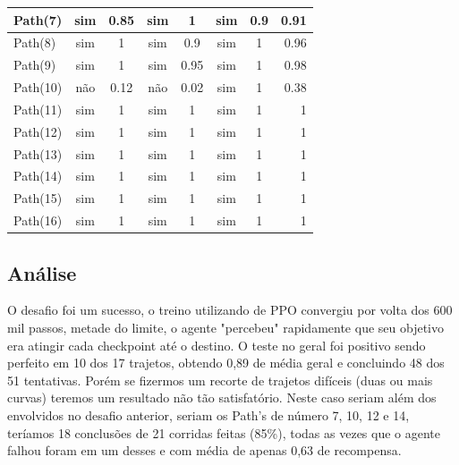 \begin{table}[htpb]
\begin{tabular}{|l|c|c|c|c|c|c|r|}
            Path(7)   &      sim        &   0.85          &    sim          &      1        &    sim          &      0.9   &      0.91              \\ \hline
            Path(8)   &      sim        &   1             &    sim          &      0.9      &    sim          &      1     &      0.96              \\ \hline
            Path(9)   &      sim        &   1             &    sim          &      0.95     &    sim          &      1     &      0.98              \\ \hline
            Path(10)  &      não        &   0.12          &    não          &      0.02     &    sim          &      1     &      0.38              \\ \hline
            Path(11)  &      sim        &   1             &    sim          &      1        &    sim          &      1     &      1                 \\ \hline
            Path(12)  &      sim        &   1             &    sim          &      1        &    sim          &      1     &      1                 \\ \hline
            Path(13)  &      sim        &   1             &    sim          &      1        &    sim          &      1     &      1                 \\ \hline
            Path(14)  &      sim        &   1             &    sim          &      1        &    sim          &      1     &      1                 \\ \hline
            Path(15)  &      sim        &   1             &    sim          &      1        &    sim          &      1     &      1                 \\ \hline
            Path(16)  &      sim        &   1             &    sim          &      1        &    sim          &      1     &      1                 \\ \hline
    \end{tabular}
\end{table}
\subsection*{Análise}
O desafio foi um sucesso, o treino utilizando de PPO convergiu por volta dos 600 mil passos, metade do limite, o agente "percebeu" rapidamente que seu objetivo era atingir cada checkpoint até o destino. O teste no geral foi positivo sendo perfeito em 10 dos 17 trajetos, obtendo 0,89 de média geral e concluindo 48 dos 51 tentativas. 
Porém se fizermos um recorte de trajetos difíceis (duas ou mais curvas) teremos um resultado não tão satisfatório. Neste caso seriam além dos envolvidos no desafio anterior, seriam os Path's de número 7, 10, 12 e 14, teríamos 18 conclusões de 21 corridas feitas (85\%), todas as vezes que o agente falhou foram em um desses e com média de apenas 0,63 de recompensa.